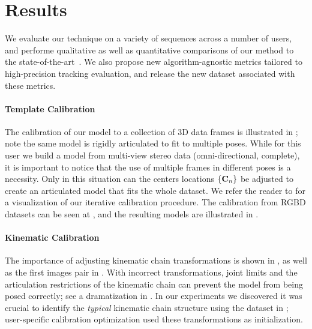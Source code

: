 \section{Results}
\label{sec:results}
We evaluate our technique on a variety of sequences across a number of users, and performe qualitative as well as quantitative comparisons of our method to the state-of-the-art~\cite{qian2014realtime,sridhar2015fast,tagliasacchi2015robust,sharp2015accurate,taylor2016concerto}. We also propose new algorithm-agnostic metrics tailored to high-precision tracking evaluation, and release the new \handy{} dataset associated with these metrics.

\paragraph{Template Calibration}
The calibration of our model to a collection of 3D data frames is illustrated in ; note the same model is rigidly articulated to fit to multiple poses. While for this user we build a model from multi-view stereo data (omni-directional, complete), it is important to notice that the use of multiple frames in different poses is a necessity. Only in this situation can the centers locations ${\{\mathbf{C}_n\}}$ be  adjusted to create an articulated model that  fits the whole dataset. We refer the reader to \VideoMVS{} for a visualization of our iterative calibration procedure. The calibration from RGBD datasets can be seen at \VideoCalibRGB{}, and the resulting models are illustrated in . 

\paragraph{Kinematic Calibration}
The importance of adjusting kinematic chain transformations is shown in , as well as the first images pair in . With incorrect  transformations, joint limits and the articulation restrictions of the kinematic chain can prevent the model from being posed correctly; see a dramatization in \VideoKinematic{}. In our experiments we discovered it was crucial to identify the \emph{typical} kinematic chain structure using the dataset in ; user-specific calibration optimization used these transformations as initialization.


